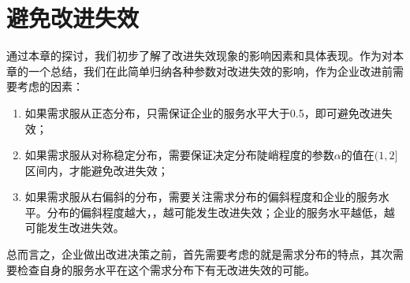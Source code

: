 \section{避免改进失效}

通过本章的探讨，我们初步了解了改进失效现象的影响因素和具体表现。作为对本章的一个总结，我们在此简单归纳各种参数对改进失效的影响，作为企业改进前需要考虑的因素：

\begin{enumerate}
\item 如果需求服从正态分布，只需保证企业的服务水平大于0.5，即可避免改进失效；
\item 如果需求服从对称稳定分布，需要保证决定分布陡峭程度的参数$\alpha$的值在$(1,2]$区间内，才能避免改进失效；
\item 如果需求服从右偏斜的分布，需要关注需求分布的偏斜程度和企业的服务水平。分布的偏斜程度越大，，越可能发生改进失效；企业的服务水平越低，越可能发生改进失效。
\end{enumerate}

总而言之，企业做出改进决策之前，首先需要考虑的就是需求分布的特点，其次需要检查自身的服务水平在这个需求分布下有无改进失效的可能。





















